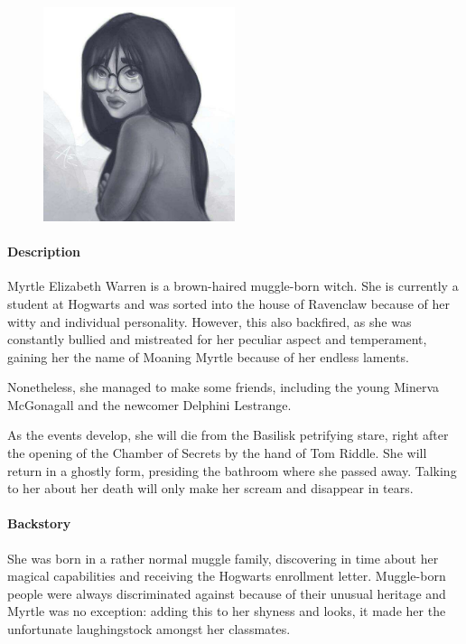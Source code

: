 \begin{figure}
\centering
\includegraphics[max width=0.5\textwidth]{../Pictures/Characters/Portraits/Myrtle_portrait.png}
\end{figure}

\paragraph{Description}
Myrtle Elizabeth Warren is a brown-haired muggle-born witch. She is currently a student at Hogwarts and was sorted into the house of Ravenclaw because of her witty and individual personality. However, this also backfired, as she was constantly bullied and mistreated for her peculiar aspect and temperament, gaining her the name of Moaning Myrtle because of her endless laments.

Nonetheless, she managed to make some friends, including the young Minerva McGonagall and the newcomer Delphini Lestrange.

As the events develop, she will die from the Basilisk petrifying stare, right after the opening of the Chamber of Secrets by the hand of Tom Riddle. She will return in a ghostly form, presiding the bathroom where she passed away. Talking to her about her death will only make her scream and disappear in tears.

\paragraph{Backstory}
She was born in a rather normal muggle family, discovering in time about her magical capabilities and receiving the Hogwarts enrollment letter. Muggle-born people were always discriminated against because of their unusual heritage and Myrtle was no exception: adding this to her shyness and looks, it made her the unfortunate laughingstock amongst her classmates.

